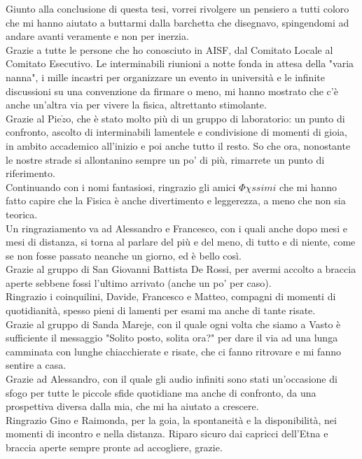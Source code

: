 \noindent Giunto alla conclusione di questa tesi, vorrei rivolgere un pensiero a tutti coloro che mi hanno aiutato a buttarmi dalla barchetta che disegnavo, spingendomi ad andare avanti veramente e non per inerzia.\\
Grazie a tutte le persone che ho conosciuto in AISF, dal Comitato Locale al Comitato Esecutivo.
Le interminabili riunioni a notte fonda in attesa della "varia nanna", i mille incastri per organizzare un evento in università e le infinite discussioni su una convenzione da firmare o meno, mi hanno mostrato che c'è anche un'altra via per vivere la fisica, altrettanto stimolante.\\
Grazie al Pie$\check{z}$o, che è stato molto più di un gruppo di laboratorio: un punto di confronto, ascolto di interminabili lamentele e condivisione di momenti di gioia, in ambito accademico all'inizio e poi anche tutto il resto.
So che ora, nonostante le nostre strade si allontanino sempre un po' di più, rimarrete un punto di riferimento.\\
Continuando con i nomi fantasiosi, ringrazio gli amici $\Phi\chi ssimi$ che mi hanno fatto capire che la Fisica è anche divertimento e leggerezza, a meno che non sia teorica.\\
Un ringraziamento va ad Alessandro e Francesco, con i quali anche dopo mesi e mesi di distanza, si torna al parlare del più e del meno, di tutto e di niente, come se non fosse passato neanche un giorno, ed è bello così.\\
Grazie al gruppo di San Giovanni Battista De Rossi, per avermi accolto a braccia aperte sebbene fossi l'ultimo arrivato (anche un po' per caso).\\
Ringrazio i coinquilini, Davide, Francesco e Matteo, compagni di momenti di quotidianità, spesso pieni di lamenti per esami ma anche di tante risate. \\
Grazie al gruppo di Sanda Mareje, con il quale ogni volta che siamo a Vasto è sufficiente il messaggio "Solito posto, solita ora?" per dare il via ad una lunga camminata con lunghe chiacchierate e risate, che ci fanno ritrovare e mi fanno sentire a casa.\\
Grazie ad Alessandro, con il quale gli audio infiniti sono stati un'occasione di sfogo per tutte le piccole sfide quotidiane ma anche di confronto, da una prospettiva diversa dalla mia, che mi ha aiutato a crescere.\\
Ringrazio Gino e Raimonda, per la goia, la spontaneità e la disponibilità, nei momenti di incontro e nella distanza.
Riparo sicuro dai capricci dell'Etna e braccia aperte sempre pronte ad accogliere, grazie.\\
